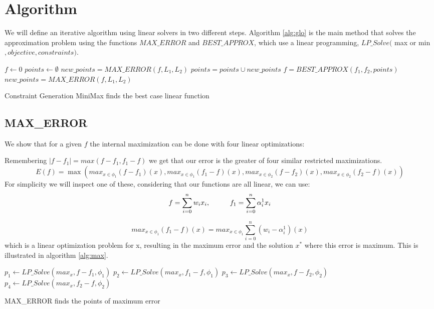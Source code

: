 \section{Algorithm}
We will define an iterative algorithm using linear solvers in two different steps. Algorithm \ref{alg:glo} is the main method that solves the approximation problem using the functions $MAX\_ERROR$ and $BEST\_APPROX$, which use a linear programming, $LP\_Solve($ max or min$, objective, constraints)$.

\begin{algorithm}[!h]
\dontprintsemicolon
{}
$f \gets 0$\;
$points \gets \emptyset$\;
$new\_points = MAX\_ERROR(f, L_1,L_2)$\;
 {
	$points = points \cup new\_points$\;
	$f = BEST\_APPROX(f_1,f_2,points)$\;
	$new\_points = MAX\_ERROR(f, L_1,L_2)$\;}
\;
\caption{{\sc Constraint Generation MiniMax} finds the best case linear function}
\label{alg:glo}
\end{algorithm}

\subsection{MAX\_ERROR}
We show that for a given $f$ the internal maximization can be done with four linear optimizations:

Remembering $ |f - f_1| = max (f-f_1,f_1-f)$ we get that our error is the greater of four similar restricted maximizations.
$$ E(f) =\max \left( max_{x\in \phi_1} (f - f_1) (x),
max_{x\in \phi_1} (f _1- f) (x),
max_{x\in \phi_2} (f - f_2) (x),
max_{x\in \phi_2} (f_2 - f) (x)
\right)$$
For simplicity we will inspect one of these, considering that our functions are all linear, we can use:
$$ f = \sum_{i=0}^n w_i x_i,  \mbox{\rule{1cm}{0cm}} 
f_1 = \sum_{i=0}^n \alpha_i^1 x_i$$

$$max_{x\in \phi_1} (f _1- f) (x) = max_{x\in \phi_1}\sum_{i=0}^n (w_i- \alpha_i^1) (x) $$
which is a linear optimization problem for x, resulting in the maximum error and the solution $x^*$  where this error is maximum.
This is illustrated in algorithm \ref{alg:max}.

\begin{algorithm}[!h]
\dontprintsemicolon
{}
$p_1 \gets LP\_Solve(max _x, f-f_1,\phi_1)$\;
$p_2 \gets LP\_Solve(max_x, f_1-f,\phi_1)$\;
$p_3 \gets LP\_Solve(max_x, f-f_2,\phi_2)$\;
$p_4 \gets LP\_Solve(max_x, f_2-f,\phi_2)$\;
\;
\caption{{\sc MAX\_ERROR} finds the points of maximum error}
\label{alg:max}
\end{algorithm}

